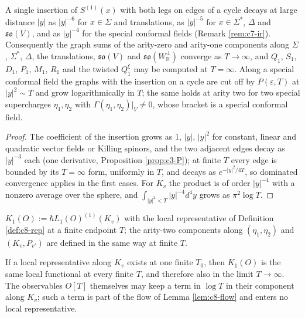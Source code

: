 \begin{proposition}
\label{prop:c8-Tsafe}
A single insertion of $S^{(1)}(x)$ with both legs on edges of a cycle decays at large distance $|y|$ as $|y|^{-6}$ for $x\in\Sigma$ and translations, as $|y|^{-5}$ for $x\in\Sigma^*$, $\Delta$ and $\mathfrak{so}(V)$, and as $|y|^{-4}$ for the special conformal fields (Remark \ref{rem:c7-ir}). Consequently the graph sums of the arity-zero and arity-one components along $\Sigma$, $\Sigma^*$, $\Delta$, the translations, $\mathfrak{so}(V)$ and $\mathfrak{so}(W_{\mathbb R}^\perp)$ converge as $T\to\infty$, and $Q_1$, $S_1$, $D_1$, $P_1$, $M_1$, $R_1$ and the twisted $Q^\xi_1$ may be computed at $T=\infty$. Along a special conformal field the graphs with the insertion on a cycle are cut off by $P(\varepsilon,T)$ at $|y|^2\sim T$ and grow logarithmically in $T$; the same holds at arity two for two special supercharges $\eta_1,\eta_2$ with $\Gamma(\eta_1,\eta_2)|_V\neq0$, whose bracket is a special conformal field.
\end{proposition}

\begin{proof}
The coefficient of the insertion grows as $1$, $|y|$, $|y|^2$ for constant, linear and quadratic vector fields or Killing spinors, and the two adjacent edges decay as $|y|^{-3}$ each (one derivative, Proposition \ref{prop:c3-P}); at finite $T$ every edge is bounded by its $T=\infty$ form, uniformly in $T$, and decays as $e^{-|y|^2/4T}$, so dominated convergence applies in the first cases. For $K_v$ the product is of order $|y|^{-4}$ with a nonzero average over the sphere, and $\int_{|y|^2<T}|y|^{-4}d^4y$ grows as $\pi^2\log T$.
\end{proof}

\begin{definition}
\label{def:c8-K}
$K_1(O):=\hbar L_1(O)^{(1)}(K_v)$ with the local representative of Definition \ref{def:c8-rep} at a finite endpoint $T$; the arity-two components along $(\eta_1,\eta_2)$ and $(K_v,P_{v'})$ are defined in the same way at finite $T$.
\end{definition}

\begin{theorem}
\label{thm:c8-K}
If a local representative along $K_v$ exists at one finite $T_0$, then $K_1(O)$ is the same local functional at every finite $T$, and therefore also in the limit $T\to\infty$. The observables $O[T]$ themselves may keep a term in $\log T$ in their component along $K_v$; such a term is part of the flow of Lemma \ref{lem:c8-flow} and enters no local representative.
\end{theorem}

